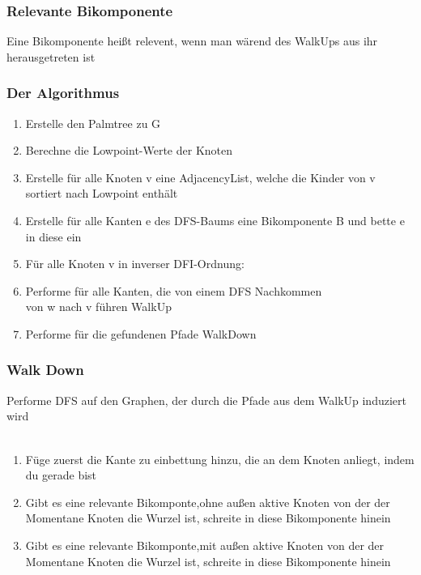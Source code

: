 \documentclass{beamer}
\begin{document}
    \begin{frame}
        \frametitle{Relevante Bikomponente}
            \begin{Definition}
                Eine Bikomponente heißt relevent, wenn man wärend des WalkUps aus ihr herausgetreten ist
            \end{Definition}
    \end{frame}
    \begin{frame}
        \frametitle{Der Algorithmus}
        \begin{enumerate}
            \item Erstelle den Palmtree zu G
            \item Berechne die Lowpoint-Werte der Knoten
            \item Erstelle für alle Knoten v eine AdjacencyList, welche die Kinder von v sortiert nach Lowpoint enthält 
            \item Erstelle für alle Kanten e des DFS-Baums eine Bikomponente B und bette e in diese ein
            \item Für alle Knoten v in inverser DFI-Ordnung:
            \item \; Performe für alle Kanten, die von einem DFS Nachkommen \\ \; von w nach v führen WalkUp
            \item Performe für die gefundenen Pfade WalkDown
        \end{enumerate}
    \end{frame}

    \begin{frame}
        \frametitle{Walk Down}
            Performe DFS auf den Graphen, der durch die Pfade aus dem WalkUp induziert wird\\
        \\
        \begin{enumerate}
            \item Füge zuerst die Kante zu einbettung hinzu, die an dem Knoten anliegt, indem du gerade bist
            \item Gibt es eine relevante Bikomponte,ohne außen aktive Knoten von der der Momentane Knoten die Wurzel ist, schreite in diese Bikomponente hinein
            \item Gibt es eine relevante Bikomponte,mit außen aktive Knoten von der der Momentane Knoten die Wurzel ist, schreite in diese Bikomponente hinein
        \end{enumerate}
        
    
    \end{frame}
\end{document}
